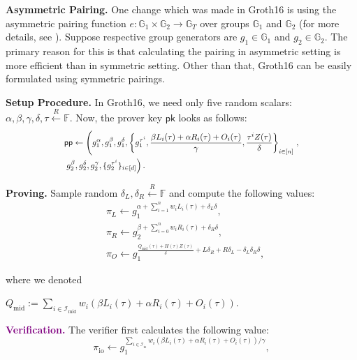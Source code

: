 \documentclass[../lecture-notes.tex]{subfiles}
\begin{document}
\textcolor{gray!75!black}{\textbf{Asymmetric Pairing.}} One change which was made in Groth16 is using the asymmetric pairing function $e: \mathbb{G}_1 \times \mathbb{G}_2 \to \mathbb{G}_T$ over groups $\mathbb{G}_1$ and $\mathbb{G}_2$ (for more details, see ). Suppose respective group generators are $g_1 \in \mathbb{G}_1$ and $g_2 \in \mathbb{G}_2$. The primary reason for this is that calculating the pairing in asymmetric setting is more efficient than in symmetric setting. Other than that, Groth16 can be easily formulated using symmetric pairings.

\textcolor{blue!75!gray}{\textbf{Setup Procedure.}} In Groth16, we need only five random scalars: $\alpha,\beta,\gamma,\delta,\tau \xleftarrow{R} \mathbb{F}$. Now, the prover key $\mathsf{pk}$ looks as follows:
\begin{equation*}
    \scalebox{0.85}{$
    \begin{aligned}
        &\mathsf{pp} \gets \left(g_1^{\alpha},g_1^{\beta},g_1^{\delta},\left\{g_1^{\tau^i},\frac{\beta L_i(\tau) + \alpha R_i(\tau) + O_i(\tau)}{\gamma}, \frac{\tau^i Z(\tau)}{\delta}\right\}_{i \in [n]} \right., \\
        & \left. g_2^{\beta}, g_2^{\delta}, g_2^{\gamma}, \{g_2^{\tau^i}\}_{i \in [d]}\right).        
    \end{aligned}
    $}
\end{equation*}

\textcolor{green!50!black}{\textbf{Proving.}} Sample random $\delta_L,\delta_R \xleftarrow{R} \mathbb{F}$ and compute the following values:
\begin{equation*}
    \begin{aligned}
        &\pi_L \gets g_1^{\alpha + \sum_{i=1}^n w_iL_i(\tau) + \delta_L\delta}, \\ & \pi_R \gets g_2^{\beta + \sum_{i=0}^n w_iR_i(\tau) + \delta_R\delta}, \\ & \pi_O \gets g_1^{\frac{Q_{\text{mid}}(\tau)+H(\tau)Z(\tau)}{\delta} + L\delta_R + R\delta_L - \delta_L\delta_R\delta},        
    \end{aligned}
\end{equation*}

where we denoted 
\begin{center}
    $Q_{\text{mid}} := \sum_{i \in \mathcal{I}_{\text{mid}}}w_i(\beta L_i(\tau) + \alpha R_i(\tau) + O_i(\tau))$.    
\end{center}

\textcolor{purple}{\textbf{Verification.}} The verifier first calculates the following value:
\begin{equation*}
    \pi_{\text{io}} \gets g_1^{\sum_{i \in \mathcal{I}_{\text{io}}}w_i(\beta L_i(\tau) + \alpha R_i(\tau) + O_i(\tau))/\gamma},
\end{equation*}
\end{document}
